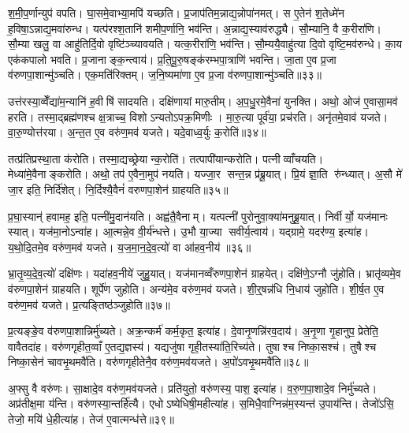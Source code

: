 श॒मी॒प॒र्णान्युप॑ वपति। घा॒समे॒वाभ्या॒मपि॑ यच्छति। प्र॒जाप॑तिम॒न्नाद्य॒न्नोपा॑नमत्। स ए॒तेन॑ श॒तेध्मे॑न ह॒विषा॒ऽन्नाद्य॒मवा॑रुन्ध। यत्प॑रश्श॒तानि॑ शमीप॒र्णानि॒ भव॑न्ति। अ॒न्नाद्य॒स्याव॑रुद्ध्यै। सौ॒म्यानि॒ वै क॒रीरा॑णि। सौ॒म्या खलु॒ वा आहु॑तिर्दि॒वो वृष्टि॑ञ्च्यावयति। यत्क॒रीरा॑णि॒ भव॑न्ति। सौ॒म्ययै॒वाहु॑त्या दि॒वो वृष्टि॒मव॑रुन्धे। का॒य एक॑कपालो भवति। प्र॒जानाङ्क॒न्त्वाय॑। प्र॒ति॒पू॒रु॒षङ्क॑रम्भपा॒त्राणि॑ भवन्ति। जा॒ता ए॒व प्र॒जा व॑रुणपा॒शान्मु॑ञ्चति। एक॒मति॑रिक्तम्। ज॒नि॒ष्यमा॑णा ए॒व प्र॒जा व॑रुणपा॒शान्मु॑ञ्चति॥३३॥\anuvakamend[नि॒रु॒प्यन्ते॑ भवतो॒ भव॑ति मेध्य॒त्वाय॑ रुन्धे॒ षट्च॑]

उत्त॑रस्या॒व्वेँद्या॑म॒न्यानि॑ ह॒वीषि॑ सादयति। दक्षि॑णायां मारु॒तीम्। अ॒प॒धु॒रमे॒वैना॑ युनक्ति। अथो॒ ओज॑ ए॒वासा॒मव॑ हरति। तस्मा॒द्ब्रह्म॑णश्च क्ष॒त्राच्च॒ विशोऽन्यतोऽपक्र॒मिणीः। मा॒रु॒त्या पूर्व॑या॒ प्रच॑रति। अनृ॑तमे॒वाव॑ यजते। वा॒रु॒ण्योत्त॑रया। अ॒न्त॒त ए॒व वरु॑ण॒मव॑ यजते। यदे॒वाध्व॒र्युः क॒रोति॑॥३४॥

तत्प्र॑तिप्रस्था॒ता क॑रोति। तस्मा॒द्यच्छ्रेयान्क॒रोति॑। तत्पापी॑यान्करोति। पत्नीव्वाँचयति। मेध्या॑मे॒वैनाङ्करोति। अथो॒ तप॑ ए॒वैना॒मुप॑ नयति। यज्जा॒र सन्त॒न्न प्र॑ब्रू॒यात्। प्रि॒यं ज्ञा॒ति रु॑न्ध्यात्। अ॒सौ मे॑ जा॒र इति॒ निर्दि॑शेत्। नि॒र्दिश्यै॒वैनं॑ वरुणपा॒शेन॑ ग्राहयति॥३५॥

प्र॒घा॒स्यान्॑ हवामह॒ इति॒ पत्नी॑मु॒दान॑यति। अह्व॑तै॒वैनाम्। यत्पत्नी॑ पुरोनुवा॒क्या॑मनुब्रू॒यात्। निर्वीर्यो॒ यज॑मानः स्यात्। यज॑मा॒नोऽन्वा॑ह। आ॒त्मन्ने॒व वी॒र्य॑न्धत्ते। उ॒भौ या॒ज्या सवीर्य॒त्वाय॑। यद्ग्रामे॒ यदर॑ण्य॒ इत्या॑ह। य॒थो॒दि॒तमे॒व वरु॑ण॒मव॑ यजते। य॒ज॒मा॒न॒दे॒व॒त्यो॑ वा आ॑हव॒नीय॑॥३६॥

भ्रा॒तृ॒व्य॒दे॒व॒त्यो॑ दक्षि॑णः। यदा॑हव॒नीये॑ जुहु॒यात्। यज॑मानव्वँरुणपा॒शेन॑ ग्राहयेत्। दक्षि॑णे॒ऽग्नौ जु॑होति। भ्रातृ॑व्यमे॒व व॑रुणपा॒शेन॑ ग्राहयति। शूर्पे॑ण जुहोति। अन्य॑मे॒व वरु॑ण॒मव॑ यजते। शी॒र्॒षन्न॑धि नि॒धाय॑ जुहोति। शी॒र्\mbox{}ष॒त ए॒व वरु॑ण॒मव॑ यजते। प्र॒त्यङ्तिष्ठ॑ञ्जुहोति॥३७॥

प्र॒त्यङ्ङे॒व व॑रुणपा॒शान्निर्मु॑च्यते। अक्र॒न्कर्म॑ कर्म॒कृत॒ इत्या॑ह। दे॒वानृ॒णन्नि॑रव॒दाय॑। अ॒नृ॒णा गृ॒हानुप॒ प्रेतेति॒ वावैतदा॑ह। वरु॑णगृहीत॒व्वाँ ए॒तद्य॒ज्ञस्य॑। यद्यजु॑षा गृही॒तस्या॑ति॒रिच्य॑ते। तुषाश्च निष्का॒सश्च॑। तुषैश्च निष्का॒सेन॑ चावभृ॒थमवै॑ति। वरु॑णगृहीतेनै॒व वरु॑ण॒मव॑यजते। अ॒पो॑ऽवभृ॒थमवै॑ति॥३८॥

अ॒फ्सु वै वरु॑णः। सा॒क्षादे॒व वरु॑ण॒मव॑यजते। प्रति॑युतो॒ वरु॑णस्य॒ पाश॒ इत्या॑ह। व॒रु॒ण॒पा॒शादे॒व निर्मु॑च्यते। अप्र॑तीक्ष॒मा य॑न्ति। वरु॑णस्या॒न्तर्\mbox{}हि॑त्यै। एधोऽष्येधिषी॒महीत्या॑ह। स॒मिधै॒वाग्निन्न॑म॒स्यन्त॑ उ॒पाय॑न्ति। तेजो॑ऽसि॒ तेजो॒ मयि॑ धे॒हीत्या॑ह। तेज॑ ए॒वात्मन्ध॑त्ते॥३९॥

